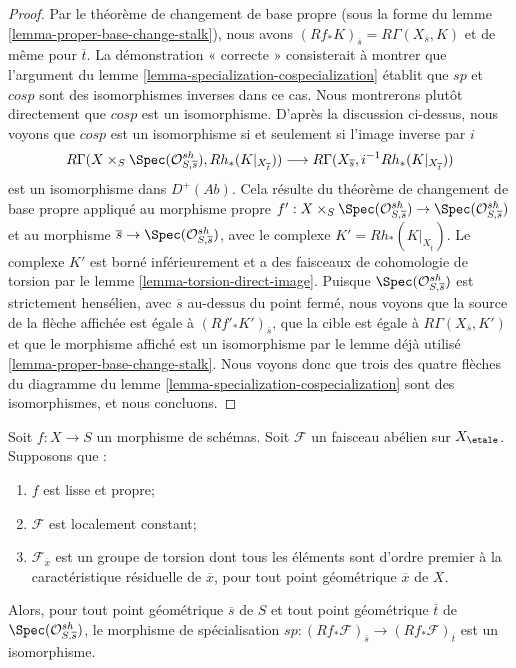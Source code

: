 \begin{proof}
Par le théorème de changement de base propre (sous la forme du
lemme \ref{lemma-proper-base-change-stalk}), nous avons
$(Rf_*K)_{\overline{s}} = R\Gamma(X_{\overline{s}}, K)$
et de même pour $\overline{t}$. La démonstration « correcte » consisterait
à montrer que l'argument du
lemme \ref{lemma-specialization-cospecialization}
établit que $sp$ et $cosp$ sont des isomorphismes inverses dans ce cas.
Nous montrerons plutôt directement que $cosp$ est un isomorphisme.
D'après la discussion ci-dessus, nous voyons que $cosp$ est un isomorphisme
si et seulement si l'image inverse par $i$
$$
R\Gamma(X \times_S \Spec(\mathcal{O}^{sh}_{S, \overline{s}}),
Rh_*(K|_{X_{\overline{t}}}))
\longrightarrow
R\Gamma(X_{\overline{s}}, i^{-1}Rh_*(K|_{X_{\overline{t}}}))
$$
est un isomorphisme dans $D^+(\textit{Ab})$. Cela résulte du théorème de
changement de base propre appliqué au morphisme propre
$f' : X \times_S \Spec(\mathcal{O}^{sh}_{S, \overline{s}}) \to
\Spec(\mathcal{O}^{sh}_{S, \overline{s}})$
et au morphisme $\overline{s} \to \Spec(\mathcal{O}^{sh}_{S, \overline{s}})$,
avec le complexe $K' = Rh_*(K|_{X_{\overline{t}}})$. Le complexe
$K'$ est borné inférieurement et a des faisceaux de cohomologie de torsion
par le lemme \ref{lemma-torsion-direct-image}.
Puisque $\Spec(\mathcal{O}^{sh}_{S, \overline{s}})$ est strictement hensélien,
avec $\overline{s}$ au-dessus du point fermé,
nous voyons que la source de la flèche affichée est égale à
$(Rf'_*K')_{\overline{s}}$, que la cible est égale à
$R\Gamma(X_{\overline{s}}, K')$ et que le morphisme affiché est un isomorphisme
par le lemme déjà utilisé
\ref{lemma-proper-base-change-stalk}.
Nous voyons donc que trois des quatre flèches du diagramme
du lemme \ref{lemma-specialization-cospecialization} sont des isomorphismes,
et nous concluons.
\end{proof}

\begin{lemma}
\label{lemma-sp-isom-proper-loc-cst-torsion}
Soit $f : X \to S$ un morphisme de schémas. Soit $\mathcal{F}$
un faisceau abélien sur $X_\etale$. Supposons que :
\begin{enumerate}
\item $f$ est lisse et propre;
\item $\mathcal{F}$ est localement constant;
\item $\mathcal{F}_{\overline{x}}$ est un groupe de torsion dont
tous les éléments sont d'ordre premier à la caractéristique résiduelle de
$\overline{x}$, pour tout point géométrique $\overline{x}$ de $X$.
\end{enumerate}
Alors, pour tout point géométrique $\overline{s}$ de $S$ et tout point
géométrique $\overline{t}$ de $\Spec(\mathcal{O}^{sh}_{S, \overline{s}})$,
le morphisme de spécialisation
$sp : (Rf_*\mathcal{F})_{\overline{s}} \to (Rf_*\mathcal{F})_{\overline{t}}$
est un isomorphisme.
\end{lemma}

